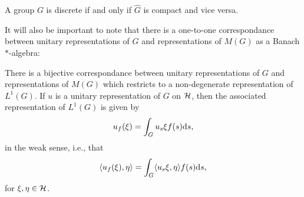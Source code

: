 \begin{proposition}
A group $G$ is discrete if and only if $\hat G$ is compact and vice versa.
\end{proposition}
It will also be important to note that there is a one-to-one correspondance between unitary representations of $G$ and representations of $M(G)$ as a Banach $*$-algebra:
\begin{proposition}
There is a bijective correspondance between unitary representations of $G$ and representations of $M(G)$ which restricts to a non-degenerate representation of $L^1(G)$. If $u$ is a unitary representation of $G$ on $\mathcal{H}$, then the associated representation of $L^1(G)$ is given by
\begin{align*}
	u_f(\xi) = \int_G u_s \xi f(s) \mathrm{d} s,
\end{align*}
in the weak sense, i.e., that 
\begin{align*}
	\langle u_f(\xi), \eta \rangle = \int_G \langle u_s \xi, \eta \rangle f(s) \mathrm{d} s,
\end{align*}
for $\xi, \eta \in \mathcal{H}$.
\end{proposition}

